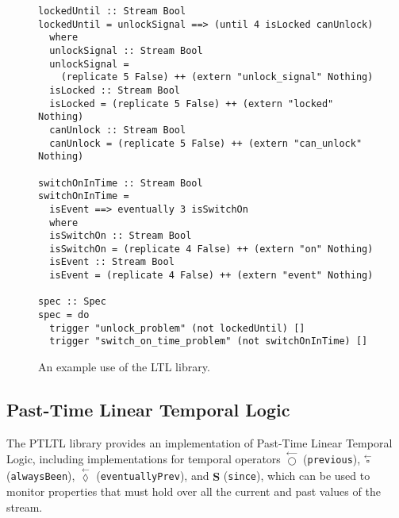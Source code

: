 \begin{figure*}[!htb]
\begin{lstlisting}[frame=none]
lockedUntil :: Stream Bool
lockedUntil = unlockSignal ==> (until 4 isLocked canUnlock)
  where
  unlockSignal :: Stream Bool
  unlockSignal =
    (replicate 5 False) ++ (extern "unlock_signal" Nothing)
  isLocked :: Stream Bool
  isLocked = (replicate 5 False) ++ (extern "locked" Nothing)
  canUnlock :: Stream Bool
  canUnlock = (replicate 5 False) ++ (extern "can_unlock" Nothing)

switchOnInTime :: Stream Bool
switchOnInTime =
  isEvent ==> eventually 3 isSwitchOn
  where
  isSwitchOn :: Stream Bool
  isSwitchOn = (replicate 4 False) ++ (extern "on" Nothing)
  isEvent :: Stream Bool
  isEvent = (replicate 4 False) ++ (extern "event" Nothing)

spec :: Spec
spec = do
  trigger "unlock_problem" (not lockedUntil) []
  trigger "switch_on_time_problem" (not switchOnInTime) []
\end{lstlisting}
\caption{An example use of the LTL library.}
\label{fig:ltl_example}
\end{figure*}

\subsection{Past-Time Linear Temporal Logic}
The PTLTL library provides an implementation of Past-Time Linear Temporal Logic,
including implementations for temporal operators
$\overset{\leftarrow}{\bigcirc}$ (\verb,previous,), $\overset{\leftarrow}{\square}$
(\verb,alwaysBeen,), $\overset{\leftarrow}{\lozenge}$ (\verb,eventuallyPrev,),
and $\mathbf{S}$ (\verb,since,), which can be used to monitor
properties that must hold over all the current and past values of the stream.

